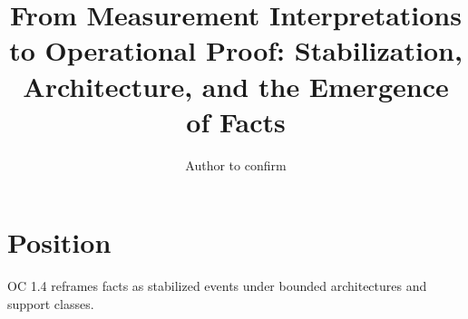 \documentclass{article}
\title{From Measurement Interpretations to Operational Proof: Stabilization, Architecture, and the Emergence of Facts}
\author{Author to confirm}
\begin{document}
\maketitle
\section{Position}
OC 1.4 reframes facts as stabilized events under bounded architectures and support classes.
\end{document}
